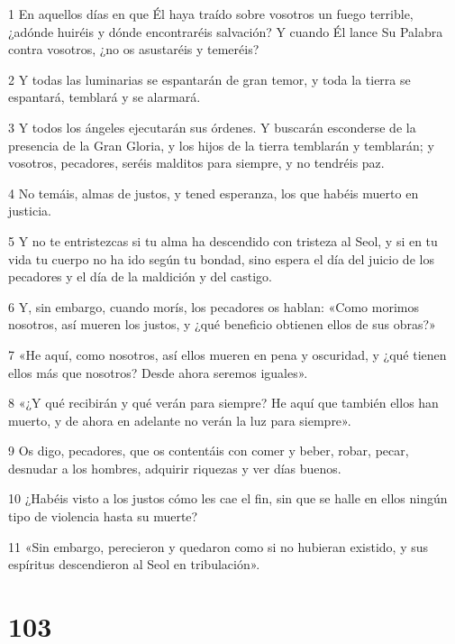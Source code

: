 \par 1 En aquellos días en que Él haya traído sobre vosotros un fuego terrible, ¿adónde huiréis y dónde encontraréis salvación? Y cuando Él lance Su Palabra contra vosotros, ¿no os asustaréis y temeréis?
\par 2 Y todas las luminarias se espantarán de gran temor, y toda la tierra se espantará, temblará y se alarmará.
\par 3 Y todos los ángeles ejecutarán sus órdenes. Y buscarán esconderse de la presencia de la Gran Gloria, y los hijos de la tierra temblarán y temblarán; y vosotros, pecadores, seréis malditos para siempre, y no tendréis paz.
\par 4 No temáis, almas de justos, y tened esperanza, los que habéis muerto en justicia.
\par 5 Y no te entristezcas si tu alma ha descendido con tristeza al Seol, y si en tu vida tu cuerpo no ha ido según tu bondad, sino espera el día del juicio de los pecadores y el día de la maldición y del castigo.
\par 6 Y, sin embargo, cuando morís, los pecadores os hablan: «Como morimos nosotros, así mueren los justos, y ¿qué beneficio obtienen ellos de sus obras?»
\par 7 «He aquí, como nosotros, así ellos mueren en pena y oscuridad, y ¿qué tienen ellos más que nosotros? Desde ahora seremos iguales».
\par 8 «¿Y qué recibirán y qué verán para siempre? He aquí que también ellos han muerto, y de ahora en adelante no verán la luz para siempre».
\par 9 Os digo, pecadores, que os contentáis con comer y beber, robar, pecar, desnudar a los hombres, adquirir riquezas y ver días buenos.
\par 10 ¿Habéis visto a los justos cómo les cae el fin, sin que se halle en ellos ningún tipo de violencia hasta su muerte?
\par 11 «Sin embargo, perecieron y quedaron como si no hubieran existido, y sus espíritus descendieron al Seol en tribulación».

\chapter{103}


